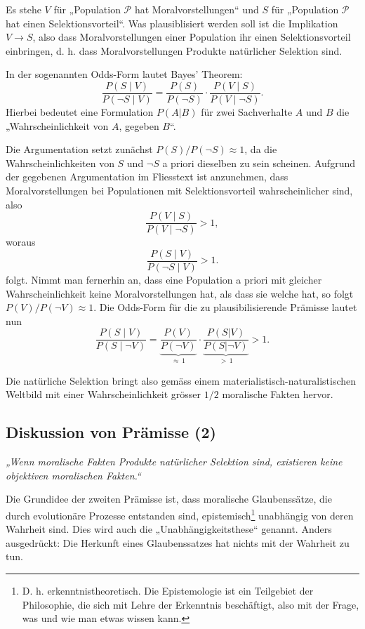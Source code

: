 \documentclass[11pt,a4paper]{article}
\begin{document}
	\begin{tcolorbox}[title=Mathematik-Box: Prämisse 1]
		Es stehe \(V\) für „Population \(\mathcal{P}\) hat Moralvorstellungen“ und \(S\) für „Population \(\mathcal{P}\) hat einen Selektionsvorteil“. Was plausiblisiert werden soll ist die Implikation $V \rightarrow S$, also dass Moralvorstellungen einer Population ihr einen Selektionsvorteil einbringen, d. h. dass Moralvorstellungen Produkte natürlicher Selektion sind. 
		
		In der sogenannten Odds-Form lautet Bayes' Theorem:
		\[
		\frac{P(S\mid V)}{P(\neg S\mid V)}
		=
		\frac{P(S)}{P(\neg S)}\cdot
		\frac{P(V\mid S)}{P(V\mid\neg S)}.
		\]
		Hierbei bedeutet eine Formulation $P(A|B)$ für zwei Sachverhalte $A$ und $B$ die „Wahrscheinlichkeit von $A$, gegeben $B$“.
		
		Die Argumentation setzt zunächst \(P(S)/P(\neg S)\approx 1\), da die Wahrscheinlichkeiten von $S$ und $\neg S$ a priori dieselben zu sein scheinen. Aufgrund der gegebenen Argumentation im Fliesstext ist anzunehmen, dass Moralvorstellungen bei Populationen mit Selektionsvorteil wahrscheinlicher sind, also
		\[
		\frac{P(V\mid S)}{P(V\mid\neg S)}> 1,
		\]
		woraus
		\[
		\frac{P(S\mid V)}{P(\neg S\mid V)}>1.
		\]
		folgt. Nimmt man fernerhin an, dass eine Population a priori mit gleicher Wahrscheinlichkeit keine Moralvorstellungen hat, als dass sie welche hat, so folgt $P(V)/P(\neg V) \approx 1$. Die Odds-Form für die zu plausibilisierende Prämisse lautet nun
		$$\frac{P(S\mid V)}{P(S\mid\neg V)} = \underbrace{\frac{P(V)}{P(\neg V)}}_{\approx \,1} \cdot \underbrace{\frac{P(S|V)}{P(S|\neg V)}}_{>\,1} > 1.$$
		
		Die natürliche Selektion bringt also gemäss einem materialistisch-naturalistischen Weltbild mit einer Wahrscheinlichkeit grösser $1/2$ moralische Fakten hervor.
	\end{tcolorbox}
	
	\subsection{Diskussion von Prämisse (2)}
	
	\textit{„Wenn moralische Fakten Produkte natürlicher Selektion sind, existieren keine objektiven moralischen Fakten.“}
	
	Die Grundidee der zweiten Prämisse ist, dass moralische Glaubenssätze, die durch evolutionäre Prozesse entstanden sind, epistemisch\footnote{D. h. erkenntnistheoretisch. Die Epistemologie ist ein Teilgebiet der Philosophie, die sich mit Lehre der Erkenntnis beschäftigt, also mit der Frage, was und wie man etwas wissen kann.} unabhängig von deren Wahrheit sind. Dies wird auch die „Unabhängigkeitsthese“ genannt. Anders ausgedrückt: Die Herkunft eines Glaubenssatzes hat nichts mit der Wahrheit zu tun.
	
\end{document}
